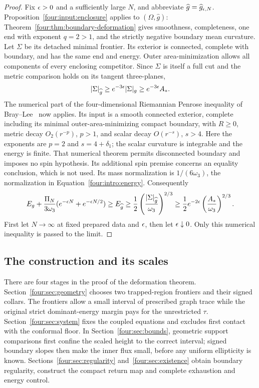 \begin{proof}
Fix $\epsilon>0$ and a sufficiently large $N$, and abbreviate
$\widehat g=\widehat g_{\epsilon,N}$. Proposition~\ref{four:input:enclosure}
applies to $(\Omega,\widehat g)$: Theorem~\ref{four:thm:boundary-deformation}
gives smoothness, completeness, one end with exponent $q=2>1$, and the
strictly negative boundary mean curvature. Let $\Sigma$ be its detached
minimal frontier. Its exterior is connected, complete with boundary,
and has the same end and energy. Outer area-minimization allows all
components of every enclosing competitor. Since $\Sigma$ is itself a
full cut and the metric comparison holds on its tangent three-planes,
\begin{equation}\label{four:end:area-comparison}
 |\Sigma|_{\widehat g}\ge e^{-3\epsilon}|\Sigma|_g
                  \ge e^{-3\epsilon}A_*.
\end{equation}
The numerical part of the four-dimensional Riemannian Penrose inequality
of Bray--Lee~\cite[Theorem~1.4]{BrayLee2009} now applies. Its input is a
smooth connected exterior, complete including its minimal
outer-area-minimizing compact boundary, with $R\ge0$, metric decay
$O_2(r^{-p})$, $p>1$, and scalar decay $O(r^{-s})$, $s>4$. Here the
exponents are $p=2$ and $s=4+\delta_1$; the scalar curvature is integrable
and the energy is finite. That numerical theorem permits disconnected
boundary and imposes no spin hypothesis. Its additional spin premise
concerns an equality conclusion, which is not used. Its mass normalization
is $1/(6\omega_3)$, the normalization in Equation~\eqref{four:intro:energy}.
Consequently
\[
 E_g+\frac{\Pi_N}{3\omega_3}
       (e^{-\epsilon N}+e^{-\epsilon N/2})
 \ge E_{\widehat g}
 \ge\frac12\left(\frac{|\Sigma|_{\widehat g}}{\omega_3}\right)^{2/3}
 \ge\frac12e^{-2\epsilon}\left(\frac{A_*}{\omega_3}\right)^{2/3}.
\]
First let $N\to\infty$ at fixed prepared data and $\epsilon$, then let
$\epsilon\downarrow0$. Only this numerical inequality is passed to the limit.
\end{proof}

\subsection{The construction and its scales}

There are four stages in the proof of the deformation theorem.
Section~\ref{four:sec:geometry} chooses two trapped-region frontiers and
their signed collars. The frontiers allow a small interval of prescribed
graph trace while the original strict dominant-energy margin pays for
the unrestricted $\tau$. Section~\ref{four:sec:system} fixes the coupled
equations and excludes first contact with the conformal floor. In
Section~\ref{four:sec:bounds}, geometric support comparisons first confine
the scaled height to the correct interval; signed boundary slopes then
make the inner flux small, before any uniform ellipticity is known.
Sections~\ref{four:sec:regularity} and~\ref{four:sec:existence} obtain
boundary regularity, construct the compact return map and complete
exhaustion and energy control.

